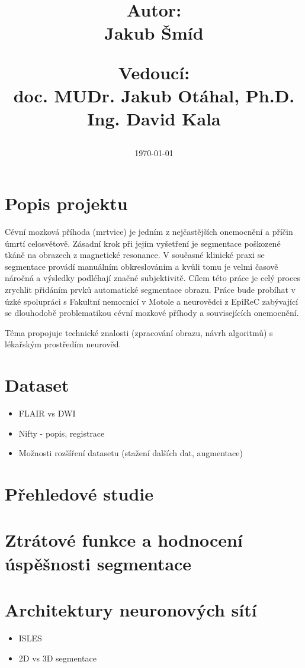 \documentclass[11pt]{article}
\date{\large \hfill \today}
\title{
	\ifdefined\Subtitle \large \Subtitle \\[1em] \fi
	\LARGE \textbf{\MainTitle} \\[2em]
	\begin{large}
	\begin{minipage}{3cm}
		\textbf{Autor:}\\
		Jakub Šmíd
	\end{minipage}
	\hfill
	\begin{minipage}{6cm}
		\textbf{Vedoucí:}\\
		doc. MUDr. Jakub Otáhal, Ph.D. \\
		Ing. David Kala
	\end{minipage}
	\end{large}
}
\begin{document}
\maketitle

\section{Popis projektu}
Cévní mozková příhoda (mrtvice) je jedním z nejčastějších onemocnění a příčin úmrtí celosvětově. Zásadní krok při jejím vyšetření je segmentace poškozené tkáně na obrazech z magnetické resonance. V současné klinické praxi se segmentace provádí manuálním obkreslováním a kvůli tomu je velmi časově náročná a výsledky podléhají značné subjektivitě. Cílem této práce je celý proces zrychlit přidáním prvků automatické segmentace obrazu.
Práce bude probíhat v úzké spolupráci s Fakultní nemocnicí v Motole a neurovědci z EpiReC zabývající se dlouhodobě problematikou cévní mozkové příhody a souvisejících onemocnění.

Téma propojuje technické znalosti (zpracování obrazu, návrh algoritmů) s lékařským prostředím neurověd.

\section{Dataset}
\begin{itemize}
	\item FLAIR vs DWI
	\item Nifty - popis, registrace
	\item Možnosti rozšíření datasetu (stažení dalších dat, augmentace)
\end{itemize}

\section{Přehledové studie}

\section{Ztrátové funkce a hodnocení úspěšnosti segmentace}

\section{Architektury neuronových sítí}
\begin{itemize}
	\item ISLES
	\item 2D vs 3D segmentace
\end{itemize}

\printbibliography
\end{document}
